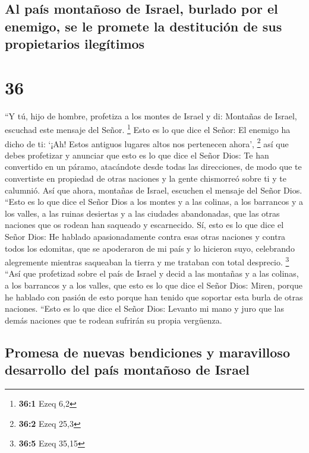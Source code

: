 \hypertarget{al-pauxeds-montauxf1oso-de-israel-burlado-por-el-enemigo-se-le-promete-la-destituciuxf3n-de-sus-propietarios-ileguxedtimos}{%
\subsection{Al país montañoso de Israel, burlado por el enemigo, se le
promete la destitución de sus propietarios
ilegítimos}\label{al-pauxeds-montauxf1oso-de-israel-burlado-por-el-enemigo-se-le-promete-la-destituciuxf3n-de-sus-propietarios-ileguxedtimos}}

\hypertarget{section-35}{%
\section{36}\label{section-35}}

 ``Y tú, hijo de hombre, profetiza a los montes de Israel
y di: Montañas de Israel, escuchad este mensaje del Señor. \footnote{\textbf{36:1}
  Ezeq 6,2}  Esto es lo que dice el Señor: El enemigo ha
dicho de ti: `¡Ah! Estos antiguos lugares altos nos pertenecen ahora',
\footnote{\textbf{36:2} Ezeq 25,3}  así que debes
profetizar y anunciar que esto es lo que dice el Señor Dios: Te han
convertido en un páramo, atacándote desde todas las direcciones, de modo
que te convertiste en propiedad de otras naciones y la gente chismorreó
sobre ti y te calumnió.  Así que ahora, montañas de
Israel, escuchen el mensaje del Señor Dios. ``Esto es lo que dice el
Señor Dios a los montes y a las colinas, a los barrancos y a los valles,
a las ruinas desiertas y a las ciudades abandonadas, que las otras
naciones que os rodean han saqueado y escarnecido.  Sí,
esto es lo que dice el Señor Dios: He hablado apasionadamente contra
esas otras naciones y contra todos los edomitas, que se apoderaron de mi
país y lo hicieron suyo, celebrando alegremente mientras saqueaban la
tierra y me trataban con total desprecio. \footnote{\textbf{36:5} Ezeq
  35,15}  ``Así que profetizad sobre el país de Israel y
decid a las montañas y a las colinas, a los barrancos y a los valles,
que esto es lo que dice el Señor Dios: Miren, porque he hablado con
pasión de esto porque han tenido que soportar esta burla de otras
naciones.  ``Esto es lo que dice el Señor Dios: Levanto mi
mano y juro que las demás naciones que te rodean sufrirán su propia
vergüenza.

\hypertarget{promesa-de-nuevas-bendiciones-y-maravilloso-desarrollo-del-pauxeds-montauxf1oso-de-israel}{%
\subsection{Promesa de nuevas bendiciones y maravilloso desarrollo del
país montañoso de
Israel}\label{promesa-de-nuevas-bendiciones-y-maravilloso-desarrollo-del-pauxeds-montauxf1oso-de-israel}}

